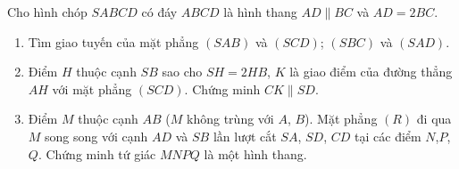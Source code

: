 \begin{bt}%
	Cho hình chóp $SABCD$ có đáy $ABCD$ là hình thang $AD \parallel BC$ và $AD = 2BC$.
	\begin{enumerate}
		\item Tìm giao tuyến của mặt phẳng $\left(SAB\right)$ và $\left(SCD\right)$; $\left(SBC\right)$ và $\left(SAD\right)$.
		\item Điểm $H$ thuộc cạnh $SB$ sao cho $SH=2HB$, $K$ là giao điểm của đường thẳng $AH$ với mặt phẳng $\left(SCD\right)$. Chứng minh $CK \parallel SD$.
		\item Điểm $M$ thuộc cạnh $AB$ ($M$ không trùng với $A$, $B$). Mặt phẳng $\left(R\right)$ đi qua $M$ song song với cạnh $AD$ và $SB$ lần lượt cắt $SA$, $SD$, $CD$ tại các điểm $N$,$P$,$Q$. Chứng minh tứ giác $MNPQ$ là một hình thang.
	\end{enumerate}
	

\end{bt}
